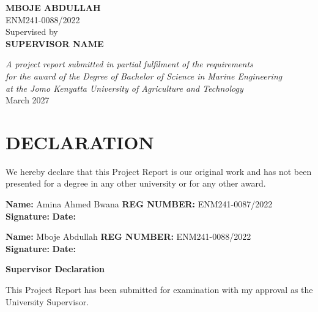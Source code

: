 \documentclass[12pt,a4paper]{report}
\begin{document}
\begin{titlepage}
\begin{center}
{{\large\textbf{MBOJE ABDULLAH}}\\[0.05cm]
{\normalsize ENM241-0088/2022}\\[0.35cm]

{\normalsize Supervised by}\\[0.15cm]
{\large\textbf{SUPERVISOR NAME}}

\vfill

{\footnotesize\textit{A project report submitted in partial fulfilment of the requirements}}\\
{\footnotesize\textit{for the award of the Degree of Bachelor of Science in Marine Engineering}}\\
{\footnotesize\textit{at the Jomo Kenyatta University of Agriculture and Technology}}\\[0.2cm]

{\footnotesize March 2027}
}
\end{center}
\end{titlepage}
\hypersetup{pageanchor=true}


\section*{DECLARATION}

We hereby declare that this Project Report is our original work and has not
been presented for a degree in any other university or for any other award.

\vspace{1cm}
\noindent
\textbf{Name:} Amina Ahmed Bwana
\hfill
\textbf{REG NUMBER:} ENM241-0087/2022\\[0.5cm]
\noindent
\textbf{Signature:} \underline{\hspace{5cm}}
\hfill
\textbf{Date:} \underline{\hspace{4cm}}

\vspace{1cm}
\noindent
\textbf{Name:} Mboje Abdullah
\hfill
\textbf{REG NUMBER:} ENM241-0088/2022\\[0.5cm]
\noindent
\textbf{Signature:} \underline{\hspace{5cm}}
\hfill
\textbf{Date:} \underline{\hspace{4cm}}

\vspace{1cm}
\noindent
\textbf{Supervisor Declaration}

\noindent
This Project Report has been submitted for examination with my approval as
the University Supervisor.
\end{document}
